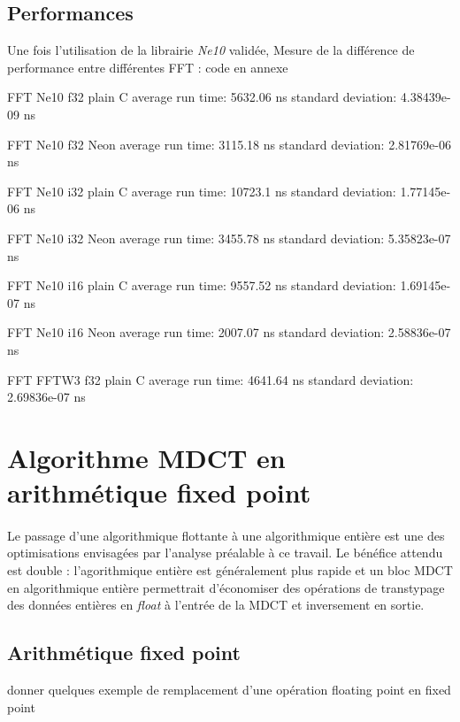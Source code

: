 \documentclass{article}
\begin{document}
    \subsection{Performances}
    Une fois l'utilisation de la librairie \emph{Ne10} validée,  Mesure de la différence de performance entre différentes FFT : code en annexe

    FFT Ne10 f32 plain C
    average run time:   5632.06 ns
    standard deviation: 4.38439e-09 ns

    FFT Ne10 f32 Neon
    average run time:   3115.18 ns
    standard deviation: 2.81769e-06 ns

    FFT Ne10 i32 plain C
    average run time:   10723.1 ns
    standard deviation: 1.77145e-06 ns

    FFT Ne10 i32 Neon
    average run time:   3455.78 ns
    standard deviation: 5.35823e-07 ns

    FFT Ne10 i16 plain C
    average run time:   9557.52 ns
    standard deviation: 1.69145e-07 ns

    FFT Ne10 i16 Neon
    average run time:   2007.07 ns
    standard deviation: 2.58836e-07 ns

    FFT FFTW3 f32 plain C
    average run time:   4641.64 ns
    standard deviation: 2.69836e-07 ns



    \section{Algorithme MDCT en arithmétique fixed point}
    \label{sec:fixed_point}
    \paragraph{}
    Le passage d'une algorithmique flottante à une algorithmique entière est une des optimisations envisagées par l'analyse préalable à ce travail. Le bénéfice attendu est double : l'agorithmique entière est généralement plus rapide et un bloc MDCT en algorithmique entière permettrait d'économiser des opérations de transtypage des données entières en \emph{float} à l'entrée de la MDCT et inversement en sortie.

    \paragraph{}



    \subsection{Arithmétique fixed point}
    donner quelques exemple de remplacement d'une opération floating point en fixed point
\end{document}

